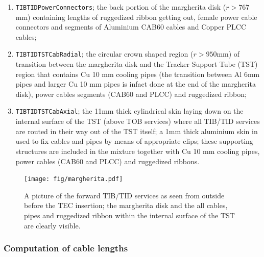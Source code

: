 \begin{enumerate}
\item{\tt TIBTIDPowerConnectors}; the back portion of the margherita disk ($r>767$mm) containing lengths of ruggedized ribbon getting out, female power cable connectors and segments of Aluminium CAB60 cables and Copper PLCC cables;
\item{\tt TIBTIDTSTCabRadial}; the circular crown shaped region ($r>950$mm) of transition between the margherita disk and the Tracker Support Tube (TST) region that contains Cu 10 mm cooling pipes (the transition between Al 6mm pipes and larger Cu 10 mm pipes is infact done at the end of the margherita disk), power cables segments (CAB60 and PLCC) and ruggedized ribbon;
\item{\tt TIBTIDTSTCabAxial}; the 11mm thick cylindrical skin laying down on the internal surface of the TST (above TOB services) where all TIB/TID services are routed in their way out of the TST itself; a 1mm thick aluminium skin in used to fix cables and pipes by means of appropriate clips; these supporting structures are included in the mixture together with Cu 10 mm cooling pipes, power cables (CAB60 and PLCC) and ruggedized ribbons.
\end{enumerate}




\begin{figure}[t]
\texttt{[image: fig/margherita.pdf]}
\caption{A picture of the forward TIB/TID services as seen from outside before the TEC insertion; the margherita disk and the all cables, pipes and ruggedized ribbon within the internal surface of the TST are clearly visible. }
\label{fig:margherita}
\end{figure}
%


\subsubsection{Computation of cable lengths}

